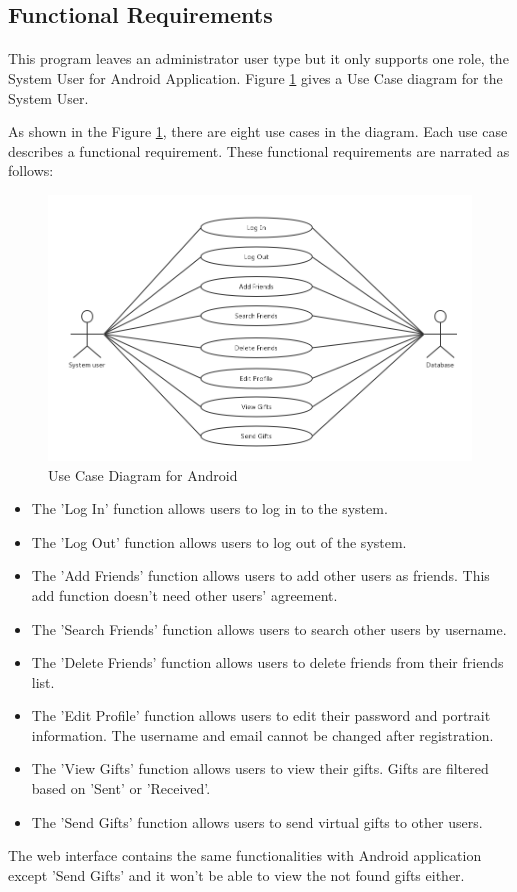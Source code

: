 \subsection{Functional Requirements}
\paragraph{}
This program leaves an administrator user type but it only supports one role, the System User for Android Application. Figure \ref{Use Cases Diagram} gives a Use Case diagram for the System User.
\par As shown in the Figure \ref{Use Cases Diagram}, there are eight use cases in the diagram. Each use case describes a functional requirement. These functional requirements are narrated as follows:

\begin{figure}[htb]
\centering
\includegraphics[width=.5\textwidth]{section02/assets/UseCase.png}
\caption[Short Caption 2]{\label{Use Cases Diagram}Use Case Diagram for Android}
\end{figure}

\begin{itemize}
\item The 'Log In' function allows users to log in to the system.
\item The 'Log Out' function allows users to log out of the system.
\item The 'Add Friends' function allows users to add other users as friends. This add function doesn't need other users' agreement.
\item The 'Search Friends' function allows users to search other users by username.
\item The 'Delete Friends' function allows users to delete friends from their friends list.
\item The 'Edit Profile' function allows users to edit their password and portrait information. The username and email cannot be changed after registration. 
\item The 'View Gifts' function allows users to view their gifts. Gifts are filtered based on 'Sent' or 'Received'.
\item The 'Send Gifts' function allows users to send virtual gifts to other users.
\end{itemize}
\par The web interface contains the same functionalities with Android application except 'Send Gifts' and it won't be able to view the not found gifts either.



